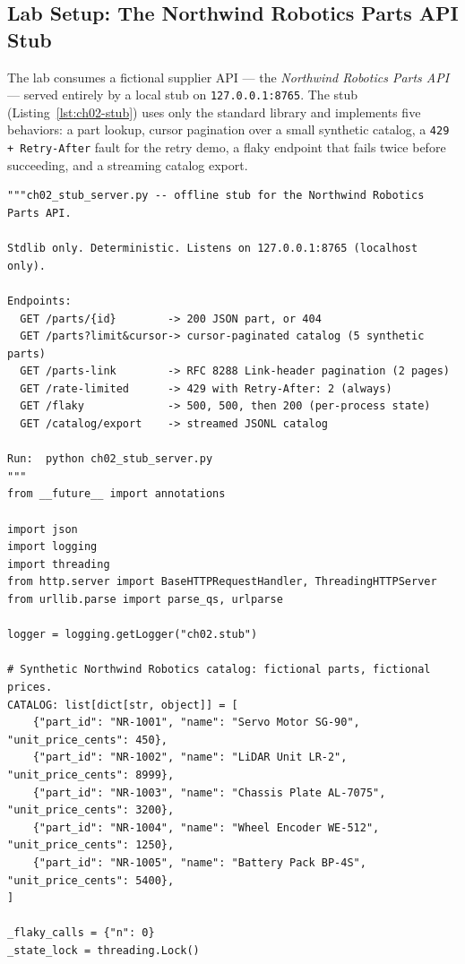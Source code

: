 \subsection{Lab Setup: The Northwind Robotics Parts API Stub}

The lab consumes a fictional supplier API --- the \emph{Northwind Robotics
Parts API} --- served entirely by a local stub on \texttt{127.0.0.1:8765}.
The stub (Listing~\ref{lst:ch02-stub}) uses only the standard library and
implements five behaviors: a part lookup, cursor pagination over a small
synthetic catalog, a \texttt{429 + Retry-After} fault for the retry demo, a
flaky endpoint that fails twice before succeeding, and a streaming catalog
export.

\begin{verbatim}
"""ch02_stub_server.py -- offline stub for the Northwind Robotics Parts API.

Stdlib only. Deterministic. Listens on 127.0.0.1:8765 (localhost only).

Endpoints:
  GET /parts/{id}        -> 200 JSON part, or 404
  GET /parts?limit&cursor-> cursor-paginated catalog (5 synthetic parts)
  GET /parts-link        -> RFC 8288 Link-header pagination (2 pages)
  GET /rate-limited      -> 429 with Retry-After: 2 (always)
  GET /flaky             -> 500, 500, then 200 (per-process state)
  GET /catalog/export    -> streamed JSONL catalog

Run:  python ch02_stub_server.py
"""
from __future__ import annotations

import json
import logging
import threading
from http.server import BaseHTTPRequestHandler, ThreadingHTTPServer
from urllib.parse import parse_qs, urlparse

logger = logging.getLogger("ch02.stub")

# Synthetic Northwind Robotics catalog: fictional parts, fictional prices.
CATALOG: list[dict[str, object]] = [
    {"part_id": "NR-1001", "name": "Servo Motor SG-90", "unit_price_cents": 450},
    {"part_id": "NR-1002", "name": "LiDAR Unit LR-2", "unit_price_cents": 8999},
    {"part_id": "NR-1003", "name": "Chassis Plate AL-7075", "unit_price_cents": 3200},
    {"part_id": "NR-1004", "name": "Wheel Encoder WE-512", "unit_price_cents": 1250},
    {"part_id": "NR-1005", "name": "Battery Pack BP-4S", "unit_price_cents": 5400},
]

_flaky_calls = {"n": 0}
_state_lock = threading.Lock()



\end{verbatim}
